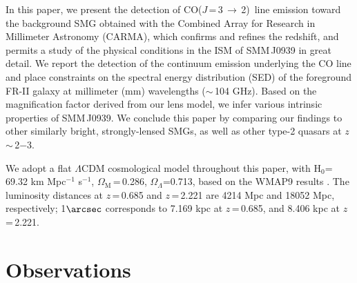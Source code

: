 \documentclass[iop, revtex4]{emulateapj}
\newcommand{\CO}{\mbox{CO($J$\,=\,3\,$\rightarrow$\,2) }}
\newcommand{\pmOne}{\mbox{$^{-1}$}}
\begin{document}
In this paper, we present the detection of \CO line emission toward the background SMG obtained with the Combined
Array for Research in Millimeter Astronomy (CARMA), which confirms and refines the redshift, and permits a study of the physical conditions in the ISM of SMM\,J0939 in great detail. We report the detection of the continuum emission underlying the CO line and place constraints on the spectral energy distribution (SED) of the foreground FR-II galaxy at millimeter (mm) wavelengths ($\sim$\,104 GHz). Based on the magnification factor derived from our lens model, we infer various intrinsic properties of SMM\,J0939. We
conclude this paper by comparing our findings to other similarly bright, strongly-lensed SMGs, as well as other type-2 quasars at $z$\,$\sim$\,2$-$3.

We adopt a flat $\Lambda$CDM cosmological model throughout this paper, with H$_0$= 69.32 km\,\,Mpc\pmOne\,\,s\pmOne, $\Omega_\textrm{M}$\,=\,0.286, $\Omega_\Lambda$=0.713, based on the WMAP9 results \citep{Hinshaw13a}.
The luminosity distances at $z$\,=\,0.685 and $z$\,=\,2.221 are 4214 Mpc and 18052 Mpc, respectively; 1$\arcsec$
corresponds to 7.169 kpc at $z$\,=\,0.685, and 8.406 kpc at $z$\,=\,2.221.

\section{Observations}\label{sec:obs}
\end{document}
